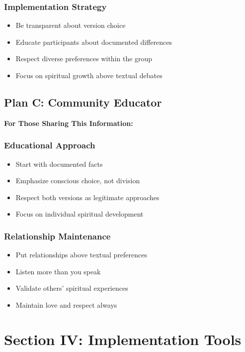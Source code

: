 \documentclass[11pt,twoside]{book}
\begin{document}
\subsubsection*{Implementation Strategy}
\label{sec:orgimplementation}
\begin{itemize}
\item Be transparent about version choice
\item Educate participants about documented differences
\item Respect diverse preferences within the group
\item Focus on spiritual growth above textual debates
\end{itemize}

\subsection*{Plan C: Community Educator}
\label{sec:orgeducator}

\textbf{For Those Sharing This Information:}

\subsubsection*{Educational Approach}
\label{sec:orgeducational}
\begin{itemize}
\item Start with documented facts
\item Emphasize conscious choice, not division
\item Respect both versions as legitimate approaches
\item Focus on individual spiritual development
\end{itemize}

\subsubsection*{Relationship Maintenance}
\label{sec:orgrelationship}
\begin{itemize}
\item Put relationships above textual preferences
\item Listen more than you speak
\item Validate others' spiritual experiences
\item Maintain love and respect always
\end{itemize}

\section*{Section IV: Implementation Tools}
\label{sec:orgimplementation2}
\end{document}
